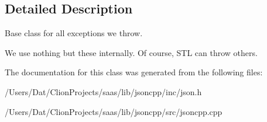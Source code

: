 \subsection{Detailed Description}
Base class for all exceptions we throw.

We use nothing but these internally. Of course, S\+TL can throw others. 

The documentation for this class was generated from the following files\+:\begin{DoxyCompactItemize}
\item 
/\+Users/\+Dat/\+Clion\+Projects/saas/lib/jsoncpp/inc/json.\+h\item 
/\+Users/\+Dat/\+Clion\+Projects/saas/lib/jsoncpp/src/jsoncpp.\+cpp\end{DoxyCompactItemize}
